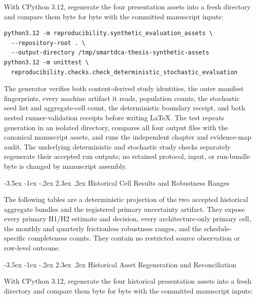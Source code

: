 \documentclass[12pt,a4paper,oneside]{report}
\makeatletter
\renewcommand\section{\@startsection{section}{1}{\z@}%
  {-3.5ex \@plus -1ex \@minus -.2ex}%
  {2.3ex \@plus .2ex}%
  {\normalfont\fontsize{14}{17}\selectfont\bfseries}}
\makeatother
\begin{document}
With CPython 3.12, regenerate the four presentation assets into a fresh
directory and compare them byte for byte with the committed manuscript inputs:

\begin{verbatim}
python3.12 -m reproducibility.synthetic_evaluation_assets \
  --repository-root . \
  --output-directory /tmp/smartdca-thesis-synthetic-assets
python3.12 -m unittest \
  reproducibility.checks.check_deterministic_stochastic_evaluation
\end{verbatim}

The generator verifies both content-derived study identities, the outer
manifest fingerprints, every machine artifact it reads, population counts,
the stochastic seed list and aggregate-cell count, the deterministic boundary
receipt, and both nested runner-validation receipts before writing LaTeX. The
test repeats generation in an isolated directory, compares all four output
files with the canonical manuscript assets, and runs the independent chapter
and evidence-map audit. The underlying deterministic and stochastic study
checks separately regenerate their accepted run outputs; no retained protocol,
input, or run-bundle byte is changed by manuscript assembly.

\section{Historical Cell Results and Robustness Ranges}
\label{sec:supp-historical}

The following tables are a deterministic projection of the two accepted
historical aggregate bundles and the registered primary uncertainty artifact.
They expose every primary H1/H2 estimate and decision, every architecture-only
primary cell, the monthly and quarterly frictionless robustness ranges, and
the schedule-specific completeness counts. They contain no restricted source
observation or row-level outcome.



\section{Historical Asset Regeneration and Reconciliation}
\label{sec:supp-historical-regeneration}

With CPython 3.12, regenerate the four historical presentation assets into a
fresh directory and compare them byte for byte with the committed manuscript
inputs:
\end{document}
